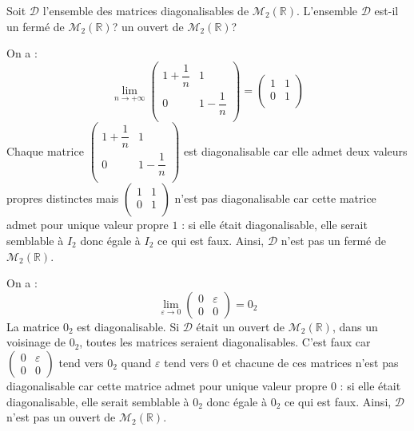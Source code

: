 \documentclass[a4paper,10pt]{report}
\begin{document}
\begin{Exa} Soit $\mathcal{D}$ l'ensemble des matrices diagonalisables de $\mathcal{M}_2(\mathbb{R})$. L'ensemble $\mathcal{D}$ est-il un fermé de $\mathcal{M}_2(\mathbb{R})$? un ouvert de $\mathcal{M}_2(\mathbb{R})$?
\end{Exa}

\corr On a :
$$ \lim_{n \rightarrow + \infty} \begin{pmatrix}
1+ \dfrac{1}{n} & 1 \\
0 & 1- \dfrac{1}{n} \\
\end{pmatrix} = \begin{pmatrix}
1 & 1 \\
0 & 1 \\
\end{pmatrix}$$
Chaque matrice $\begin{pmatrix}
1+ \dfrac{1}{n} & 1 \\
0 & 1- \dfrac{1}{n} \\
\end{pmatrix}$ est diagonalisable car elle admet deux valeurs propres distinctes mais $\begin{pmatrix}
1 & 1 \\
0 & 1 \\
\end{pmatrix}$ n'est pas diagonalisable car cette matrice admet pour unique valeur propre $1$ : si elle était diagonalisable, elle serait semblable à $I_2$ donc égale à $I_2$ ce qui est faux. Ainsi, $\mathcal{D}$ n'est pas un fermé de $\mathcal{M}_2(\mathbb{R})$.

\medskip

\noindent On a : 
$$ \lim_{\varepsilon \rightarrow 0} \begin{pmatrix}
0 & \varepsilon \\
0 & 0 
\end{pmatrix} = 0_2$$
La matrice $0_2$ est diagonalisable. Si $\mathcal{D}$ était un ouvert de $\mathcal{M}_2(\mathbb{R})$, dans un voisinage de $0_2$, toutes les matrices seraient diagonalisables. C'est faux car $\begin{pmatrix}
0 & \varepsilon \\
0 & 0 
\end{pmatrix}$ tend vers $0_2$ quand $\varepsilon$ tend vers $0$ et chacune de ces matrices n'est pas diagonalisable car cette matrice admet pour unique valeur propre $0$ : si elle était diagonalisable, elle serait semblable à $0_2$ donc égale à $0_2$ ce qui est faux. Ainsi, $\mathcal{D}$ n'est pas un ouvert de $\mathcal{M}_2(\mathbb{R})$.
\end{document}
